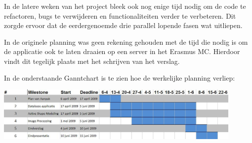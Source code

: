 In de latere weken van het project bleek ook nog enige tijd nodig om de code te
refactoren, bugs te verwijderen en functionaliteiten verder te verbeteren. Dit
zorgde ervoor dat de eerdergenoemde drie parallel lopende fasen wat uitliepen.

In de originele planning was geen rekening gehouden met de tijd die nodig is om
de applicatie ook te laten draaien op een server in het Erasmus MC. Hierdoor
vindt dit tegelijk plaats met het schrijven van het verslag.

In de onderstaande Ganntchart is te zien hoe de werkelijke planning verliep:

\includegraphics[width=0.9\textwidth]{ganntafter}
